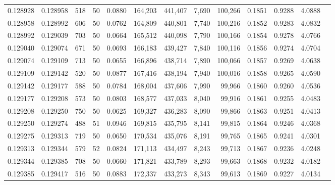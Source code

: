 \begin{tabular}{rrrrrrrrrrrrr}
0.128928 & 0.128958 &   518 &  50 &                                     0.0880 & 164,203 & 441,407 &   7,690 & 100,266 & 0.1851 & 0.9288 & 4.0888 \\
0.128958 & 0.128992 &   606 &  50 &                                     0.0762 & 164,809 & 440,801 &   7,740 & 100,216 & 0.1852 & 0.9283 & 4.0832 \\
0.128992 & 0.129039 &   703 &  50 &                                     0.0664 & 165,512 & 440,098 &   7,790 & 100,166 & 0.1854 & 0.9278 & 4.0766 \\
0.129040 & 0.129074 &   671 &  50 &                                     0.0693 & 166,183 & 439,427 &   7,840 & 100,116 & 0.1856 & 0.9274 & 4.0704 \\
0.129074 & 0.129109 &   713 &  50 &                                     0.0655 & 166,896 & 438,714 &   7,890 & 100,066 & 0.1857 & 0.9269 & 4.0638 \\
0.129109 & 0.129142 &   520 &  50 &                                     0.0877 & 167,416 & 438,194 &   7,940 & 100,016 & 0.1858 & 0.9265 & 4.0590 \\
0.129142 & 0.129177 &   588 &  50 &                                     0.0784 & 168,004 & 437,606 &   7,990 &  99,966 & 0.1860 & 0.9260 & 4.0536 \\
0.129177 & 0.129208 &   573 &  50 &                                     0.0803 & 168,577 & 437,033 &   8,040 &  99,916 & 0.1861 & 0.9255 & 4.0483 \\
0.129208 & 0.129250 &   750 &  50 &                                     0.0625 & 169,327 & 436,283 &   8,090 &  99,866 & 0.1863 & 0.9251 & 4.0413 \\
0.129250 & 0.129274 &   488 &  51 &                                     0.0946 & 169,815 & 435,795 &   8,141 &  99,815 & 0.1864 & 0.9246 & 4.0368 \\
0.129275 & 0.129313 &   719 &  50 &                                     0.0650 & 170,534 & 435,076 &   8,191 &  99,765 & 0.1865 & 0.9241 & 4.0301 \\
0.129313 & 0.129344 &   579 &  52 &                                     0.0824 & 171,113 & 434,497 &   8,243 &  99,713 & 0.1867 & 0.9236 & 4.0248 \\
0.129344 & 0.129385 &   708 &  50 &                                     0.0660 & 171,821 & 433,789 &   8,293 &  99,663 & 0.1868 & 0.9232 & 4.0182 \\
0.129385 & 0.129417 &   516 &  50 &                                     0.0883 & 172,337 & 433,273 &   8,343 &  99,613 & 0.1869 & 0.9227 & 4.0134 \\

\end{tabular}
